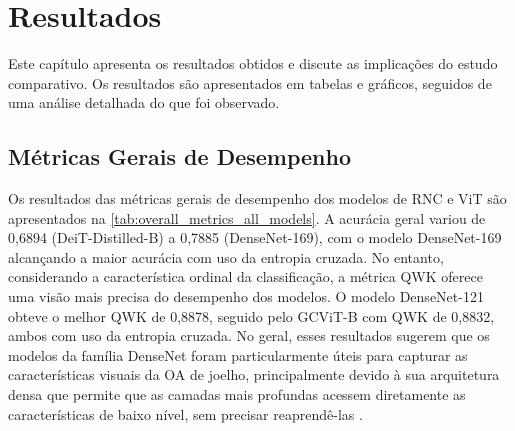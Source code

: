 \chapter{Resultados} \label{cap:resultados}

Este capítulo apresenta os resultados obtidos e discute as implicações do estudo comparativo. Os resultados são apresentados em tabelas e gráficos, seguidos de uma análise detalhada do que foi observado.

\section{Métricas Gerais de Desempenho}

Os resultados das métricas gerais de desempenho dos modelos de RNC e ViT são apresentados na \autoref{tab:overall_metrics_all_models}. A acurácia geral variou de 0,6894 (DeiT-Distilled-B) a 0,7885 (DenseNet-169), com o modelo DenseNet-169 alcançando a maior acurácia com uso da entropia cruzada. No entanto, considerando a característica ordinal da classificação, a métrica QWK oferece uma visão mais precisa do desempenho dos modelos. O modelo DenseNet-121 obteve o melhor QWK de 0,8878, seguido pelo GCViT-B com QWK de 0,8832, ambos com uso da entropia cruzada. No geral, esses resultados sugerem que os modelos da família DenseNet foram particularmente úteis para capturar as características visuais da OA de joelho, principalmente devido à sua arquitetura densa que permite que as camadas mais profundas acessem diretamente as características de baixo nível, sem precisar reaprendê-las \citep{Huang2017}.

